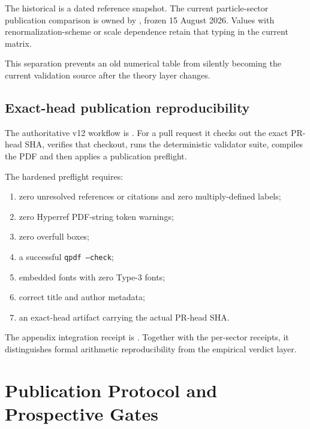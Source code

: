 \documentclass[11pt,a4paper,twoside]{book}
\theoremstyle{definition}
\begin{document}
The historical
is a dated reference snapshot.  The current particle-sector publication
comparison is owned by
,
frozen 15 August 2026.  Values with renormalization-scheme or scale dependence
retain that typing in the current matrix.

This separation prevents an old numerical table from silently becoming the
current validation source after the theory layer changes.

\section{Exact-head publication reproducibility}

The authoritative v12 workflow is
.
For a pull request it checks out the exact PR-head SHA, verifies that checkout,
runs the deterministic validator suite, compiles the PDF and then applies a
publication preflight.

The hardened preflight requires:
\begin{enumerate}
\item zero unresolved references or citations and zero multiply-defined labels;
\item zero Hyperref PDF-string token warnings;
\item zero overfull boxes;
\item a successful \texttt{qpdf --check};
\item embedded fonts with zero Type-3 fonts;
\item correct title and author metadata;
\item an exact-head artifact carrying the actual PR-head SHA.
\end{enumerate}

The appendix integration receipt is
.
Together with the per-sector receipts, it distinguishes formal arithmetic
reproducibility from the empirical verdict layer.

\clearpage

\chapter{Publication Protocol and Prospective Gates}
\label{app:v12_publication_protocol}
\end{document}
